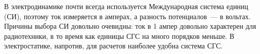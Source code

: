 В электродинамике почти всегда используется Международная система единиц (СИ), поэтому ток измеряется в амперах, а разность потенциалов~--- в вольтах. Причины выбора СИ довольно очевидны: ток в 1 ампер довольно характерен для радиотехники, в то время как единицы СГС на много порядков меньше. В электростатике, напротив, для расчетов наиболее удобна система СГС.
